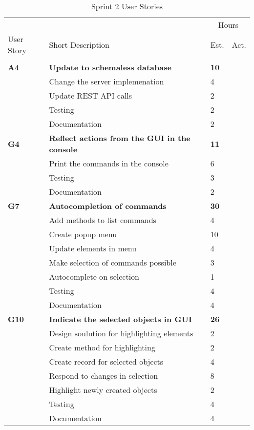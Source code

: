 \begin{table}
\caption{Sprint 2 User Stories}
\centering
\begin{tabular}{ l p{8cm} l l }
\hline 
			&				&\multicolumn{2}{c}{Hours}			\\
 User Story	& Short Description		&Est.		&Act.	                               \\ 
\hline \\ [-2.0ex]
 \bf{A4}     &\bf{Update to schemaless database}		&\bf{10}		&\bf{}          \\ 
		  &Change the server implemenation		&4			&		\\
		  &Update REST API calls					&2			&		\\
		  &Testing							&2			&		\\
		  &Documentation						&2			&		\\

 \bf{G4}     &\bf{Reflect actions from the GUI in the console} 		&\bf{11}		&\bf{}               \\ 
		  &Print the commands in the console				&6			&		\\
		  &Testing									&3			&		\\
		  &Documentation								&2			&		\\

 \bf{G7}     &\bf{Autocompletion of commands} 	&\bf{30}		&\bf{}		     \\ 
		  &Add methods to list commands		&4			&		\\
		  &Create popup menu				&10			&		\\
		  &Update elements in menu			&4			&		\\
		  &Make selection of commands possible&3			&		\\
		  &Autocomplete on selection			&1			&		\\
		  &Testing						&4			&		\\
		  &Documentation					&4			&		\\

 \bf{G10}   &\bf{Indicate the selected objects in GUI}		&\bf{26}		&\bf{}		     \\ 
		  &Design soulution for highlighting elements	&2			&		\\
		  &Create method for highlighting				&2			&		\\
		  &Create record for selected objects			&4			&		\\
		  &Respond to changes in selection				&8			&		\\
		  &Highlight newly created objects				&2			&		\\
		  &Testing								&4			&		\\
		  &Documentation							&4			&		\\


\end{tabular}
\end{table}
